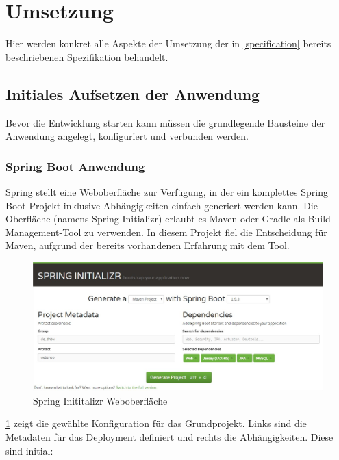 \section{Umsetzung} \thispagestyle{nomarkstyle}
Hier werden konkret alle Aspekte der Umsetzung der in \cref{specification} bereits beschriebenen Spezifikation behandelt. %
 
\subsection{Initiales Aufsetzen der Anwendung}
Bevor die Entwicklung starten kann müssen die grundlegende Bausteine der Anwendung angelegt, konfiguriert und verbunden werden. 

\subsubsection{Spring Boot Anwendung}\label{spring-boot-init}
Spring stellt eine Weboberfläche zur Verfügung, in der ein komplettes Spring Boot Projekt inklusive Abhängigkeiten einfach generiert werden kann. Die Oberfläche (namens Spring Initializr) erlaubt es Maven oder Gradle als Build-Management-Tool zu verwenden. In diesem Projekt fiel die Entscheidung für Maven, aufgrund der bereits vorhandenen Erfahrung mit dem Tool. 

\begin{figure}[th!]
	\centering
	\includegraphics[width=\linewidth]{bilder/kap7/Spring-Initializr}
	\caption{Spring Inititalizr Weboberfläche}
	\label{fig:spring-initializr}
\end{figure}

\cref{fig:spring-initializr} zeigt die gewählte Konfiguration für das Grundprojekt. Links sind die Metadaten für das Deployment definiert und rechts die Abhängigkeiten. Diese sind initial:

